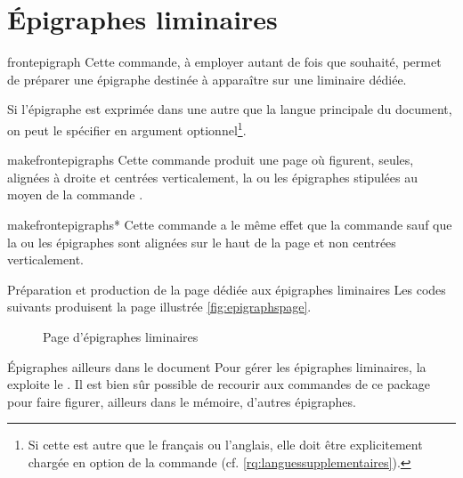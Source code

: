 \section{Épigraphes liminaires}

\begin{docCommand}{frontepigraph}{}
  Cette commande, à employer autant de fois que
  souhaité\hauteurpage{}, permet de préparer une épigraphe destinée à
  apparaître sur une \gls{liminaire} dédiée.

  Si l'épigraphe est exprimée dans une   autre que la langue principale du document, on peut le
  spécifier en argument optionnel\footnote{Si cette  est autre que
    le français ou l'anglais, elle doit être explicitement chargée en option de
    la commande  (cf.
    \vref{rq:languessupplementaires}).}.
\end{docCommand}

\begin{docCommand}{makefrontepigraphs}{}
  Cette commande produit une page où figurent, seules, alignées à droite et
  centrées verticalement, la ou les épigraphes stipulées au moyen de la
  commande .
\end{docCommand}
%
\begin{docCommand}{makefrontepigraphs*}{}
  Cette commande a le même effet que la commande 
  sauf que la ou les épigraphes sont alignées sur le haut de la page et non
  centrées verticalement.
\end{docCommand}

\begin{dbexample}{Préparation et production de la page dédiée aux épigraphes
    liminaires}{}
  \NoAutoSpacing%
  Les codes suivants produisent la page illustrée \vref{fig:epigraphspage}.
\end{dbexample}

\begin{figure}[htbp]
  \centering {}
  \caption{Page d'épigraphes liminaires}
  \label{fig:epigraphspage}
\end{figure}

\begin{dbremark}{Épigraphes ailleurs dans le document}{}
  Pour gérer les épigraphes liminaires, la \yatcl{} exploite le
   . Il est bien sûr
  possible de recourir aux commandes de ce package pour faire figurer, ailleurs
  dans le mémoire, d'autres épigraphes.
\end{dbremark}

